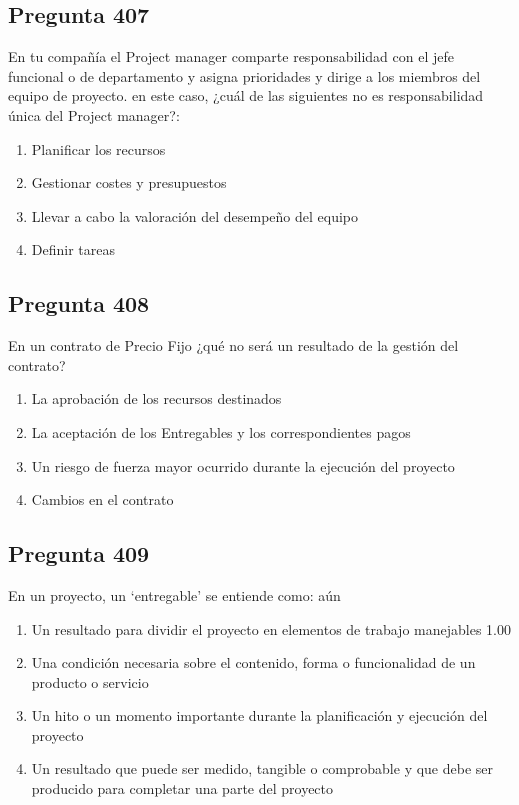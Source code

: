 \documentclass[11pt,a4paper]{article}
\begin{document}
\subsection*{Pregunta 407}
En tu compañía el Project manager comparte responsabilidad con el jefe funcional o de departamento y asigna prioridades y dirige a los miembros del equipo de proyecto. en este caso, ¿cuál de las siguientes no es responsabilidad única del Project manager?:

\begin{enumerate}[label=\alph*)]
  \item Planificar los recursos
  \item Gestionar costes y presupuestos
  \item Llevar a cabo la valoración del desempeño del equipo
  \item Definir tareas
\end{enumerate}

\subsection*{Pregunta 408}
En un contrato de Precio Fijo ¿qué no será un resultado de la gestión del contrato?

\begin{enumerate}[label=\alph*)]
  \item La aprobación de los recursos destinados
  \item La aceptación de los Entregables y los correspondientes pagos
  \item Un riesgo de fuerza mayor ocurrido durante la ejecución del proyecto
  \item Cambios en el contrato
\end{enumerate}

\subsection*{Pregunta 409}
En un proyecto, un ‘entregable' se entiende como: aún

\begin{enumerate}[label=\alph*)]
  \item Un resultado para dividir el proyecto en elementos de trabajo manejables 1.00
  \item Una condición necesaria sobre el contenido, forma o funcionalidad de un producto o servicio
  \item Un hito o un momento importante durante la planificación y ejecución del proyecto
  \item Un resultado que puede ser medido, tangible o comprobable y que debe ser producido para completar una parte del proyecto
\end{enumerate}
\end{document}
